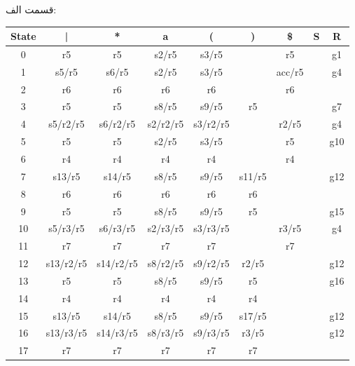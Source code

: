 

قسمت الف:

\begin{center}
    \begin{latin}
    \begin{tabular}{|c|c|c|c|c|c|c|c|c|}
    \hline
    State  & |        & *        & a        & (        & )        & \$        & S        & R \\ \hline
    0      & r5       & r5       &s2/r5     &s3/r5     &          &r5         &          & g1\\ \hline
    1      &s5/r5     &s6/r5     &s2/r5     &s3/r5     &          &acc/r5     &          & g4\\ \hline
    2      &r6        &r6        &r6        &r6        &          &r6         &          &   \\ \hline
    3      &r5        &r5        &s8/r5     &s9/r5     &r5        &           &          & g7\\ \hline
    4      &s5/r2/r5  &s6/r2/r5  &s2/r2/r5  &s3/r2/r5  &          &r2/r5      &          & g4\\ \hline
    5      &r5        &r5        &s2/r5     &s3/r5     &          &r5         &          &g10\\ \hline
    6      &r4        &r4        &r4        &r4        &          &r4         &          &   \\ \hline
    7      &s13/r5    &s14/r5    &s8/r5     &s9/r5     &s11/r5    &           &          &g12\\ \hline
    8      &r6        &r6        &r6        &r6        &r6        &           &          &   \\ \hline
    9      &r5        &r5        &s8/r5     &s9/r5     &r5        &           &          &g15\\ \hline
    10     &s5/r3/r5  &s6/r3/r5  &s2/r3/r5  &s3/r3/r5  &          &r3/r5      &          & g4\\ \hline
    11     &r7        &r7        &r7        &r7        &          &r7         &          &   \\ \hline
    12     &s13/r2/r5 &s14/r2/r5 &s8/r2/r5  &s9/r2/r5  &r2/r5     &           &          &g12\\ \hline
    13     &r5        &r5        &s8/r5     &s9/r5     &r5        &           &          &g16\\ \hline
    14     &r4        &r4        &r4        &r4        &r4        &           &          &   \\ \hline
    15     &s13/r5    &s14/r5    &s8/r5     &s9/r5     &s17/r5    &           &          &g12\\ \hline
    16     &s13/r3/r5 &s14/r3/r5 &s8/r3/r5  &s9/r3/r5  &r3/r5     &           &          &g12\\ \hline
    17     &r7        &r7        &r7        &r7        &r7        &           &          &   \\ \hline
    \end{tabular}
    \end{latin}
\end{center}

